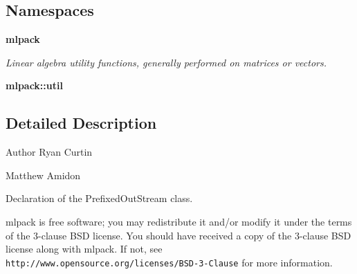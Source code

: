 \subsection*{Namespaces}
\begin{DoxyCompactItemize}
\item 
 {\bf mlpack}
\begin{DoxyCompactList}\small\item\em Linear algebra utility functions, generally performed on matrices or vectors. \end{DoxyCompactList}\item 
 {\bf mlpack\+::util}
\end{DoxyCompactItemize}


\subsection{Detailed Description}
\begin{DoxyAuthor}{Author}
Ryan Curtin 

Matthew Amidon
\end{DoxyAuthor}
Declaration of the Prefixed\+Out\+Stream class.

mlpack is free software; you may redistribute it and/or modify it under the terms of the 3-\/clause B\+SD license. You should have received a copy of the 3-\/clause B\+SD license along with mlpack. If not, see {\tt http\+://www.\+opensource.\+org/licenses/\+B\+S\+D-\/3-\/\+Clause} for more information. 